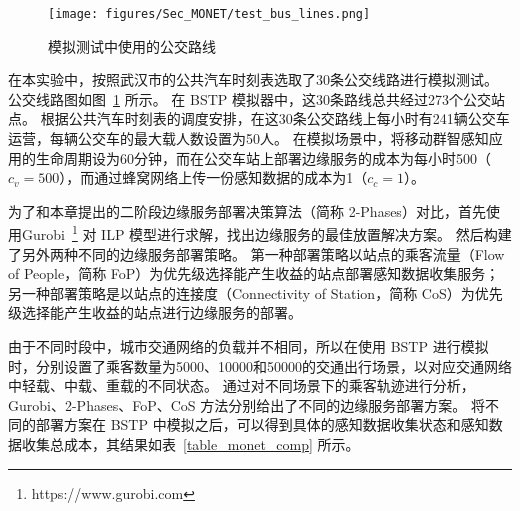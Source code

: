 \begin{figure}[!b]
  \centering
  \texttt{[image: figures/Sec\_MONET/test\_bus\_lines.png]}
  \vspace{-0.5em}
  \caption{模拟测试中使用的公交路线}
  \label{Figure_test_bus_lines}
\end{figure}

在本实验中，按照武汉市的公共汽车时刻表选取了30条公交线路进行模拟测试。
公交线路图如图~\ref{Figure_test_bus_lines} 所示。
在 BSTP 模拟器中，这30条路线总共经过273个公交站点。
根据公共汽车时刻表的调度安排，在这30条公交路线上每小时有241辆公交车运营，每辆公交车的最大载人数设置为50人。
在模拟场景中，将移动群智感知应用的生命周期设为60分钟，而在公交车站上部署边缘服务的成本为每小时500（$c_v = 500$），而通过蜂窝网络上传一份感知数据的成本为1（$c_c = 1$）。

为了和本章提出的二阶段边缘服务部署决策算法（简称 2-Phases）对比，首先使用Gurobi~\footnote{https://www.gurobi.com} 对 ILP 模型进行求解，找出边缘服务的最佳放置解决方案。
然后构建了另外两种不同的边缘服务部署策略。
第一种部署策略以站点的乘客流量（Flow of People，简称 FoP）为优先级选择能产生收益的站点部署感知数据收集服务；
另一种部署策略是以站点的连接度（Connectivity of Station，简称 CoS）为优先级选择能产生收益的站点进行边缘服务的部署。

由于不同时段中，城市交通网络的负载并不相同，所以在使用 BSTP 进行模拟时，分别设置了乘客数量为5000、10000和50000的交通出行场景，以对应交通网络中轻载、中载、重载的不同状态。
通过对不同场景下的乘客轨迹进行分析，Gurobi、2-Phases、FoP、CoS 方法分别给出了不同的边缘服务部署方案。
将不同的部署方案在 BSTP 中模拟之后，可以得到具体的感知数据收集状态和感知数据收集总成本，其结果如表~\ref{table_monet_comp} 所示。


